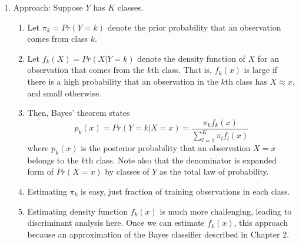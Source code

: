 \documentclass{article}
\begin{document}
\begin{enumerate}
\begin{enumerate}
    \item \textbf{Class priors:}
    \[
    P(y=0) = P(y=1) = 0.5
    \]

    \item \textbf{Class-conditional Gaussian likelihoods:}
    \[
    P(x \mid y=k) = \frac{1}{\sqrt{2 \pi \sigma^2}} \exp\Bigg( - \frac{(x - \mu_k)^2}{2 \sigma^2} \Bigg), \quad k = 0,1
    \]

    \item \textbf{Posterior probability for $x=3.2$:}
    \[
    P(y=1 \mid x=3.2) = \frac{P(x=3.2 \mid y=1) \, P(y=1)}
{P(x=3.2 \mid y=0) \, P(y=0) + P(x=3.2 \mid y=1) \, P(y=1)} \approx 0.916
    \]
    
    \item \textbf{Decision boundary:} Generally a linear function in $X$.

\end{enumerate}

\item Approach: Suppose $Y$ has $K$ classes.
\begin{enumerate}
\item Let $\pi_k = Pr(Y=k)$ denote the prior probability that an observation comes from class $k$.
\item Let $f_k(X) = Pr(X | Y=k)$ denote the density function of $X$ for an observation that comes from the $k$th class. That is, $f_k(x)$ is large if there is a high probability that an observation in the $k$th class has $X \approx x$, and small otherwise.
\item Then, Bayes' theorem states
\[
p_k(x) = Pr(Y=k | X=x) = \frac{\pi_k f_k(x)}{\sum_{l=1}^K \pi_l f_l(x)}
\]
where $p_k(x)$ is the posterior probability that an observation $X=x$ belongs to the $k$th class. Note also that the denominator is expanded form of $Pr(X=x)$ by classes of $Y$ as the total law of probability.
\item Estimating $\pi_k$ is easy, just fraction of training observations in each class.
\item Estimating density function $f_k(x)$ is much more challenging, leading to discriminant analysis here. Once we can estimate $f_k(x)$, this approach because an approximation of the Bayes classifier described in Chapter 2.
\end{enumerate}


\end{enumerate}
\end{document}
